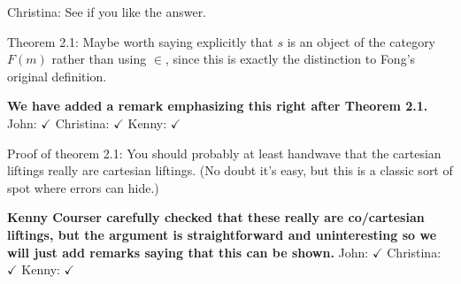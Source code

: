 \documentclass[reqno]{amsart}
\def\chris{\color{purple} Christina: }
\def\john{\color{red} John: }
\def\kenny{\color{blue} Kenny: }
\begin{document}
\begin{enumerate}
{{\chris See if you like the answer.}
\fi




\item Theorem 2.1: Maybe worth saying explicitly that $s$ is an object of the category $F(m)$ rather than using $\in$, since this is exactly the  distinction to  Fong's original definition.

{\bf  We have added a remark emphasizing this right after Theorem 2.1.}   {\john $\checkmark$} {\chris $\checkmark$} {\kenny $\checkmark$}




\item Proof of theorem 2.1: You should probably at least handwave that the cartesian liftings really are cartesian liftings. (No doubt it’s easy, but 
this 
is a classic sort of spot where errors can hide.)

\textbf{Kenny Courser carefully checked that these really are co/cartesian liftings, but the argument is straightforward and uninteresting so we will just 
add remarks saying that this can be shown.}   {\john $\checkmark$} {\chris $\checkmark$} {\kenny $\checkmark$}

\iffalse
{\kenny I think we originally had these details in our proof (of both Theorem 2.1 and Theorem 3.1) but removed them.}

{\john It's your evil advisor who removed those details.   I'll ``handwave it''---see above.}
\fi

}
\end{enumerate}
\end{document}
